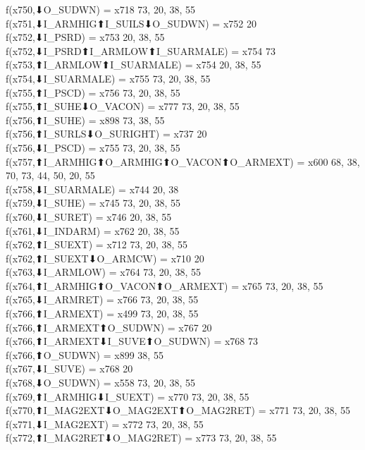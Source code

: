 f(x750,⬇O_SUDWN) = x718 {73, 20, 38, 55} \\
f(x751,⬇I_ARMHIG⬆I_SUILS⬇O_SUDWN) = x752 {20} \\
f(x752,⬇I_PSRD) = x753 {20, 38, 55} \\
f(x752,⬇I_PSRD⬆I_ARMLOW⬆I_SUARMALE) = x754 {73} \\
f(x753,⬆I_ARMLOW⬆I_SUARMALE) = x754 {20, 38, 55} \\
f(x754,⬇I_SUARMALE) = x755 {73, 20, 38, 55} \\
f(x755,⬆I_PSCD) = x756 {73, 20, 38, 55} \\
f(x755,⬆I_SUHE⬇O_VACON) = x777 {73, 20, 38, 55} \\
f(x756,⬆I_SUHE) = x898 {73, 38, 55} \\
f(x756,⬆I_SURLS⬇O_SURIGHT) = x737 {20} \\
f(x756,⬇I_PSCD) = x755 {73, 20, 38, 55} \\
f(x757,⬆I_ARMHIG⬆O_ARMHIG⬆O_VACON⬆O_ARMEXT) = x600 {68, 38, 70, 73, 44, 50, 20, 55} \\
f(x758,⬇I_SUARMALE) = x744 {20, 38} \\
f(x759,⬇I_SUHE) = x745 {73, 20, 38, 55} \\
f(x760,⬇I_SURET) = x746 {20, 38, 55} \\
f(x761,⬇I_INDARM) = x762 {20, 38, 55} \\
f(x762,⬆I_SUEXT) = x712 {73, 20, 38, 55} \\
f(x762,⬆I_SUEXT⬇O_ARMCW) = x710 {20} \\
f(x763,⬇I_ARMLOW) = x764 {73, 20, 38, 55} \\
f(x764,⬆I_ARMHIG⬆O_VACON⬆O_ARMEXT) = x765 {73, 20, 38, 55} \\
f(x765,⬇I_ARMRET) = x766 {73, 20, 38, 55} \\
f(x766,⬆I_ARMEXT) = x499 {73, 20, 38, 55} \\
f(x766,⬆I_ARMEXT⬆O_SUDWN) = x767 {20} \\
f(x766,⬆I_ARMEXT⬇I_SUVE⬆O_SUDWN) = x768 {73} \\
f(x766,⬆O_SUDWN) = x899 {38, 55} \\
f(x767,⬇I_SUVE) = x768 {20} \\
f(x768,⬇O_SUDWN) = x558 {73, 20, 38, 55} \\
f(x769,⬆I_ARMHIG⬇I_SUEXT) = x770 {73, 20, 38, 55} \\
f(x770,⬆I_MAG2EXT⬇O_MAG2EXT⬆O_MAG2RET) = x771 {73, 20, 38, 55} \\
f(x771,⬇I_MAG2EXT) = x772 {73, 20, 38, 55} \\
f(x772,⬆I_MAG2RET⬇O_MAG2RET) = x773 {73, 20, 38, 55} \\
